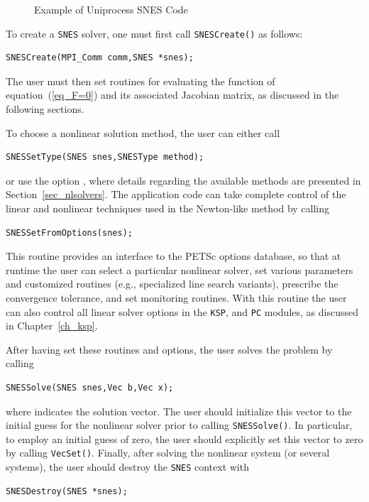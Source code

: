 \begin{figure}[H]
  
\caption{Example of Uniprocess SNES Code}
\label{fig_snesexample}
\end{figure}

To create a \lstinline{SNES} solver, one must first call \lstinline{SNESCreate()} as follows:
\begin{lstlisting}
SNESCreate(MPI_Comm comm,SNES *snes);
\end{lstlisting}
The user must then set
routines for evaluating the function of equation~(\ref{eq_F=0}) and its
associated Jacobian matrix, as discussed in the following sections.

To choose a nonlinear solution method, the user can either
call
\begin{lstlisting}
SNESSetType(SNES snes,SNESType method);
\end{lstlisting}
or use the option , 
where details regarding the available methods are presented in
Section~\ref{sec_nlsolvers}.
The application code can take complete control of the linear and
nonlinear techniques used in the Newton-like method by calling
\begin{lstlisting}
SNESSetFromOptions(snes);
\end{lstlisting}
This routine provides an interface to the PETSc options database, so
that at runtime the user can select a particular nonlinear solver, set
various parameters and customized routines (e.g., specialized line
search variants), prescribe the convergence tolerance, and set
monitoring routines.  With this routine the user can also control all
linear solver options in the \lstinline{KSP}, and \lstinline{PC} modules, as discussed
in Chapter~\ref{ch_ksp}.

After having set these routines and options, the user
solves the problem by calling
\begin{lstlisting}
SNESSolve(SNES snes,Vec b,Vec x);
\end{lstlisting}
where  indicates the solution vector. The user should
initialize this vector to the initial guess for the nonlinear solver
prior to calling \lstinline{SNESSolve()}.  In particular, to employ an
initial guess of zero, the user should explicitly set this vector to
zero by calling \lstinline{VecSet()}.  Finally, after solving the nonlinear
system (or several systems), the user should destroy the \lstinline{SNES} context
with
\begin{lstlisting}
SNESDestroy(SNES *snes);
\end{lstlisting}

